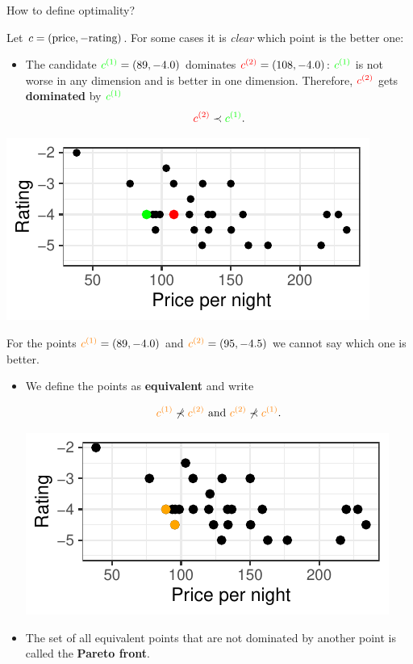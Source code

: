 \begin{frame}[allowframebreaks]{How to define optimality?}

Let $c = (\text{price}, - \text{rating})$. For some cases it is \textit{clear} which point is the better one:

\begin{itemize}
    \item The candidate $\textcolor{green}{c^{(1)}} = \left(89, - 4.0\right)$ dominates $\textcolor{red}{c^{(2)}} = \left(108, - 4.0\right)$: $\textcolor{green}{c^{(1)}}$ is not worse in any dimension and is better in one dimension. Therefore, $\textcolor{red}{c^{(2)}}$ gets \textbf{dominated} by $\textcolor{green}{c^{(1)}}$
$$
\textcolor{red}{c^{(2)}} \prec \textcolor{green}{c^{(1)}}.
$$
\end{itemize}

\centering \includegraphics[width=0.5\linewidth]{images/expedia-3-1}

\framebreak

For the points $\textcolor{orange}{c^{(1)}} = \left(89, - 4.0\right)$ and $\textcolor{orange}{c^{(2)}} = \left(95, - 4.5\right)$ we cannot say which one is better.

\begin{itemize}
\item We define the points as \textbf{equivalent} and write

$$
\textcolor{orange}{c^{(1)}} \not\prec \textcolor{orange}{c^{(2)}} \text{ and } \textcolor{orange}{c^{(2)}} \not\prec \textcolor{orange}{c^{(1)}}.
$$

\centering \includegraphics[width=0.5\linewidth]{images/expedia-4-1}


\item The set of all equivalent points that are not dominated by another point is called the \textbf{Pareto front}.


\end{itemize}
\end{frame}
